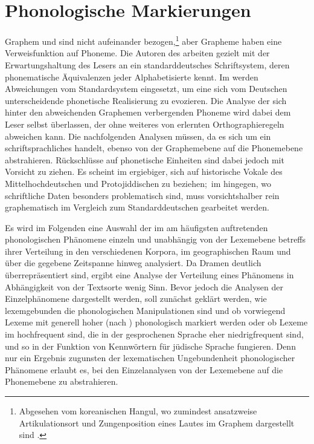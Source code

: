 \chapter{Phonologische Markierungen}\label{phonologie}
Graphem und  sind nicht  aufeinander bezogen,\footnote{Abgesehen vom koreanischen Hangul, wo zumindest ansatzweise Artikulationsort und Zungenposition eines Lautes im Graphem dargestellt sind \parencite[32]{Sampson1985}.} aber Grapheme haben eine Verweisfunktion auf Phoneme. Die Autoren des \hai{{\LiJi}} arbeiten gezielt mit der Erwartungshaltung des Lesers an ein standarddeutsches Schriftsystem, deren phonematische Äquivalenzen jeder Alphabetisierte kennt. Im \hai{{\LiJi}} werden Abweichungen vom Standardsystem eingesetzt, um eine sich vom Deutschen unterscheidende phonetische Realisierung zu evozieren. Die Analyse der sich hinter den abweichenden Graphemen verbergenden Phoneme wird dabei dem Leser selbst überlassen, der ohne weiteres von erlernten Orthographieregeln abweichen kann. Die nachfolgenden Analysen müssen, da es sich um ein schriftsprachliches  handelt, ebenso von der Graphemebene auf die Phonemebene abstrahieren. Rückschlüsse auf phonetische Einheiten sind dabei jedoch mit Vorsicht zu ziehen. Es scheint im  ergiebiger, sich auf historische Vokale des Mittelhochdeutschen und Protojiddischen zu beziehen;\, im  hingegen, wo schriftliche Daten besonders problematisch sind, muss vorsichtshalber rein graphematisch im Vergleich zum Standarddeutschen gearbeitet werden.
 
 Es wird im Folgenden eine Auswahl der im \hai{{\LiJi}} am häufigsten auftretenden phonologischen Phänomene einzeln und unabhängig von der Lexemebene betreffs ihrer Verteilung in den verschiedenen Korpora, im geographischen Raum und über die gegebene Zeitspanne hinweg analysiert. Da Dramen deutlich überrepräsentiert sind, ergibt eine Analyse der Verteilung eines Phänomens in Abhängigkeit von der Textsorte wenig Sinn. Bevor jedoch die Analysen der Einzelphänomene dargestellt werden, soll zunächst geklärt werden, wie lexemgebunden die phonologischen Manipulationen sind und ob vorwiegend Lexeme mit generell hoher  (nach \citealt{Ruoff1981}) phonologisch markiert werden oder ob Lexeme im  hochfrequent sind, die in der gesprochenen Sprache eher niedrigfrequent sind, und so in der Funktion von Kennwörtern für jüdische Sprache fungieren. Denn nur ein Ergebnis zugunsten der lexematischen Ungebundenheit phonologischer Phänomene erlaubt es, bei den Einzelanalysen von der Lexemebene auf die Phonemebene zu abstrahieren.

